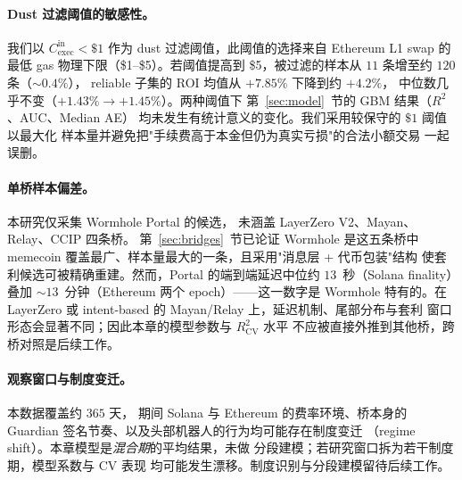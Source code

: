 \documentclass[sigconf,nonacm,10pt]{acmart}
\newcommand{\Cexec}{C_{\text{exec}}}
\begin{document}
\paragraph{Dust 过滤阈值的敏感性。} 我们以
$\Cexec^{\text{in}}<\$1$ 作为 dust 过滤阈值，此阈值的选择来自
Ethereum L1 swap 的最低 gas 物理下限（\$1--\$5）。若阈值提高到
\$5，被过滤的样本从 $11$ 条增至约 $120$ 条（$\sim0.4\%$），
reliable 子集的 ROI 均值从 $+7.85\%$ 下降到约 $+4.2\%$，
中位数几乎不变（$+1.43\%\to+1.45\%$）。两种阈值下
第~\ref{sec:model}~节的 GBM 结果（$R^2$、AUC、Median AE）
均未发生有统计意义的变化。我们采用较保守的 $\$1$ 阈值以最大化
样本量并避免把"手续费高于本金但仍为真实亏损"的合法小额交易
一起误删。

\paragraph{单桥样本偏差。} 本研究仅采集 Wormhole Portal 的候选，
未涵盖 LayerZero V2、Mayan、Relay、CCIP 四条桥。
第~\ref{sec:bridges}~节已论证 Wormhole 是这五条桥中 memecoin
覆盖最广、样本量最大的一条，且采用"消息层 + 代币包装"结构
使套利候选可被精确重建。然而，Portal 的端到端延迟中位约
$13$~秒（Solana finality）叠加 $\sim13$~分钟（Ethereum 两个
epoch）——这一数字是 Wormhole 特有的。在 LayerZero 或
intent-based 的 Mayan/Relay 上，延迟机制、尾部分布与套利
窗口形态会显著不同；因此本章的模型参数与 $R^2_{\text{CV}}$ 水平
不应被直接外推到其他桥，跨桥对照是后续工作。

\paragraph{观察窗口与制度变迁。} 本数据覆盖约 $365$ 天，
期间 Solana 与 Ethereum 的费率环境、桥本身的 Guardian
签名节奏、以及头部机器人的行为均可能存在制度变迁
（regime shift）。本章模型是\emph{混合期}的平均结果，未做
分段建模；若研究窗口拆为若干制度期，模型系数与 CV 表现
均可能发生漂移。制度识别与分段建模留待后续工作。
\end{document}
